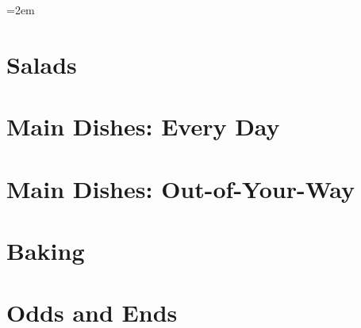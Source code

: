 \documentclass[landscape,12pt,openany]{book}
\begin{document}
\rmfamily

\setlength{\columnseprule}{0pt}
\columnsep=2em

\setcounter{tocdepth}{1}
\small
\tableofcontents

\normalsize

\setlength{\parskip}{.5em}

\chapter{Salads}











\chapter{Main Dishes: Every Day}




































\chapter{Main Dishes: Out-of-Your-Way}






\chapter{Baking}









\chapter{Odds and Ends}










\end{document}
